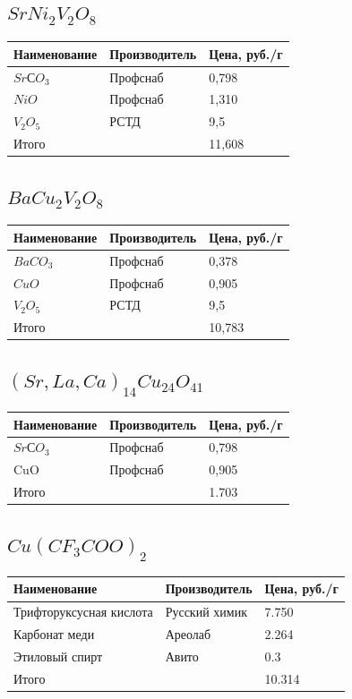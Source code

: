 \documentclass[11pt]{article}
\begin{document}
\subsection{$SrNi_2V_2O_8$}
\begin{tabular}{|l|l|l|}
\hline
	Наименование  & Производитель & Цена, руб./г\\
\hline
	$SrСO_3$ & Профснаб &  0,798 \\
\hline
	$NiO$ & Профснаб & 1,310 \\
\hline
	$V_2O_5$ & РСТД & 9,5\\
\hline	
	Итого & & 11,608 \\
\hline
\end{tabular}

\subsection{$BaCu_2V_2O_8$}
\begin{tabular}{|l|l|l|}
\hline
	Наименование  & Производитель & Цена, руб./г\\
\hline
	$BaCO_3$ & Профснаб & 0,378 \\
\hline
	$CuO$ & Профснаб & 0,905 \\
\hline
	$V_2O_5$ & РСТД & 9,5\\
\hline	
	Итого & & 10,783 \\
\hline
\end{tabular}


\subsection{$(Sr,La,Ca)_{14}Cu_{24}O_{41}$}

\begin{tabular}{|l|l|l|}
\hline
	Наименование  & Производитель & Цена, руб./г\\
\hline
	$SrСO_3$ & Профснаб &  0,798 \\
\hline
	CuO & Профснаб & 0,905 \\
\hline
	Итого & & 1.703 \\
\hline
\end{tabular}


\subsection{$Cu(CF_3COO)_2$}

\begin{tabular}{|l|l|l|}
\hline
	Наименование  & Производитель & Цена, руб./г\\
\hline
	Трифторуксусная кислота & Русский химик & 7.750 \\
\hline
	Карбонат меди & Ареолаб & 2.264\\
\hline
	Этиловый спирт & Авито & 0.3\\
\hline
	Итого & & 10.314 \\
\hline
\end{tabular}
\end{document}
